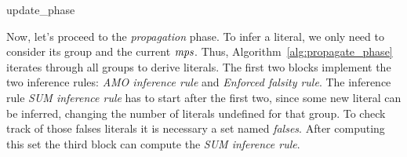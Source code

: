 \begin{algorithm}[H]\small
    \caption{update\_phase}
    \label{alg:update_phase}
\end{algorithm}

Now, let's proceed to the \textit{propagation} phase.
To infer a literal, we only need to consider its group and the current $\mathit{mps}$.
Thus, Algorithm~\ref{alg:propagate_phase} iterates through all groups to derive literals.
The first two blocks implement the two inference rules: \textit{AMO inference rule}
and \textit{Enforced falsity rule}.
The inference rule \textit{SUM inference rule} has to start after the first two, 
since some new literal can be inferred, changing the number 
of literals undefined for that group. 
To check track of those falses literals it is necessary a set named
\textit{falses}.
After computing this set the third block 
can compute the \textit{SUM inference rule}.

